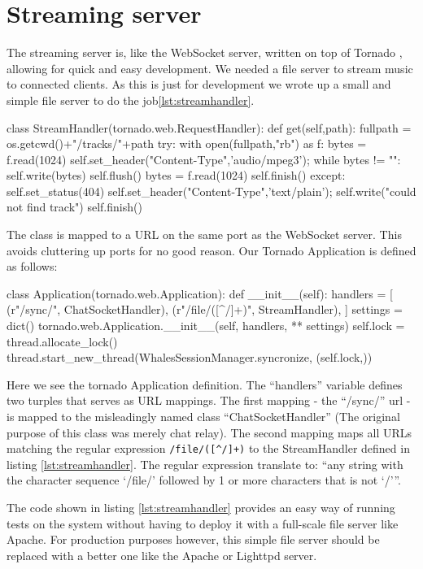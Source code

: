 \section{Streaming server}

The streaming server is, like the WebSocket server, written on top of Tornado
\cite{tornadoweb11}, allowing for quick and easy development.
We needed a file server to stream music to connected clients. As this is just
for development we wrote up a small and simple file server to do the
job\ref{lst:streamhandler}.

\begin{snippet}[language=Python,label=lst:streamhandler,caption=The streaming server] 
class StreamHandler(tornado.web.RequestHandler):
    def get(self,path):
        fullpath = os.getcwd()+"/tracks/"+path
        try:
            with open(fullpath,"rb") as f:
                bytes = f.read(1024)
                self.set_header("Content-Type",'audio/mpeg3');
                while bytes != "":
                    self.write(bytes)
                    self.flush()
                    bytes = f.read(1024)
            self.finish()
        except:
            self.set_status(404)
            self.set_header("Content-Type",'text/plain');
            self.write("could not find track")
            self.finish()
\end{snippet}

The class is mapped to a URL on the same port as the WebSocket server. This
avoids cluttering up ports for no good reason. Our Tornado Application is
defined as follows:

\begin{snippet}[language=Python,caption=The streaming server]
class Application(tornado.web.Application):
    def __init__(self):
        handlers = [
            (r"/sync/", ChatSocketHandler),
            (r"/file/([^/]+)", StreamHandler),
        ]
        settings = dict()
        tornado.web.Application.__init__(self, handlers, ** settings)
        self.lock = thread.allocate_lock()
        thread.start_new_thread(WhalesSessionManager.syncronize, (self.lock,))
\end{snippet}

Here we see the tornado Application definition. The ``handlers'' variable
defines two turples that serves as URL mappings. The first mapping - the
``/sync/'' url - is mapped to the misleadingly named class
``ChatSocketHandler'' (The original purpose of this class was merely chat
relay). The second mapping maps all URLs matching the regular expression
\verb$/file/([^/]+)$ to the StreamHandler defined in listing 
\ref{lst:streamhandler}. The regular expression translate to: ``any string 
with the character sequence `/file/' followed by 1 or more characters that is 
not `/'''.


The code shown in listing \ref{lst:streamhandler} provides an easy way of 
running tests on the system without having to deploy it with a full-scale file
server like Apache. For production purposes however, this simple file server
should be replaced with a better one like the Apache or Lighttpd server.

